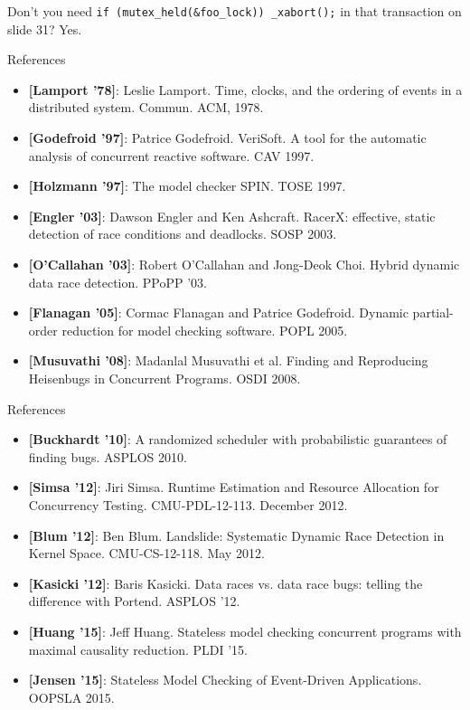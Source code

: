 \documentclass[xcolor=dvipsnames]{beamer}
\begin{document}
\begin{frame}{Don't you need \texttt{if (mutex\_held(\&foo\_lock)) \_xabort();} in that transaction on slide 31?}
	Yes.
\end{frame}

\begin{frame}{References}
	\small
	\begin{itemize}
		\item {\bf [Lamport '78]}:
			Leslie Lamport. Time, clocks, and the ordering of events in a distributed system.
			Commun. ACM, 1978.
		\item {\bf [Godefroid '97]}: Patrice Godefroid.
			VeriSoft. A tool for the automatic analysis of concurrent reactive software. CAV 1997.
		\item {\bf [Holzmann '97]}: The model checker SPIN. TOSE 1997.
		\item {\bf [Engler '03]}: Dawson Engler and Ken Ashcraft.
			RacerX: effective, static detection of race conditions and deadlocks. SOSP 2003.
		\item {\bf [O'Callahan '03]}: Robert O'Callahan and Jong-Deok Choi.
			Hybrid dynamic data race detection. PPoPP '03.
		\item {\bf [Flanagan '05]}: Cormac Flanagan and Patrice Godefroid. Dynamic partial-order reduction for
			model checking software. POPL 2005.
		\item {\bf [Musuvathi '08]}: Madanlal Musuvathi et al. Finding and Reproducing Heisenbugs in Concurrent
			Programs. OSDI 2008.
	\end{itemize}
\end{frame}
\begin{frame}{References}
	\small
	\begin{itemize}
		\item {\bf [Buckhardt '10]}: A randomized scheduler with probabilistic guarantees of finding bugs. ASPLOS 2010.
		\item {\bf [Simsa '12]}: Jiri Simsa. Runtime Estimation and Resource Allocation for
			Concurrency Testing. CMU-PDL-12-113. December 2012.
		\item {\bf [Blum '12]}: Ben Blum. Landslide: Systematic Dynamic Race Detection in Kernel
			Space. CMU-CS-12-118. May 2012.
		\item {\bf [Kasicki '12]}: Baris Kasicki. Data races vs. data race bugs: telling the difference with Portend. ASPLOS '12.
		\item {\bf [Huang '15]}: Jeff Huang. Stateless model checking concurrent programs with maximal causality reduction. PLDI '15.
		\item {\bf [Jensen '15]}: Stateless Model Checking of Event-Driven Applications. OOPSLA 2015.
	\end{itemize}
\end{frame}
\end{document}
